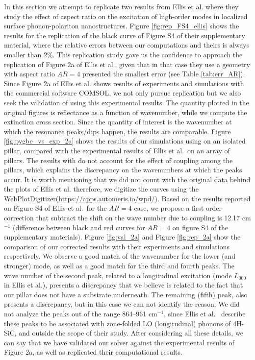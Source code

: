 In this section we attempt to replicate two results from Ellis et al. \cite{ellis2016} where they study the effect of aspect ratio on the 
excitation of high-order modes in localized surface phonon-polariton nanostructures. Figure \ref{fig:rep_FS4_ellis} shows the results for
the replication of the black curve of Figure S4 of their supplementary material, where the relative errors between our computations and 
theirs is always smaller than 2$\%$. This replication study gave us the confidence to approach the replication of Figure 2a of Ellis et al., 
given that in that case they use a geometry with aspect ratio $AR=4$ presented the smallest error (see Table \ref{tab:err_AR}). Since 
Figure 2a of Ellis et al. shows results of experiments and simulations with the commercial software COMSOL, we not only pursue replication 
but we also seek the validation of \pygbe using this experimental results. The quantity plotted in the original figures is reflectance as a 
function of wavenumber, while we compute the extinction cross section. Since the quantity of interest is the wavenumber at which the resonance 
peaks/dips happen, the results are comparable. 
Figure \ref{fig:pygbe_vs_exp_2a} shows the results of our simulations using \pygbe on an isolated pillar, compared with the experimental results
of Ellis et al.\ on an array of pillars. The results with \pygbe do not account for the effect of coupling among the pillars, which explains the  
discrepancy on the wavenumbers at which the peaks occur. It is worth mentioning that we did not count with the original data behind the plots of 
Ellis et al. therefore, we digitize the curves using the WebPlotDigitizer(\url{https://apps.automeris.io/wpd/}). Based on the results reported 
on Figure S4 of Ellis et al.\ for the $AR=4$ case, we propose a first order correction that subtract the shift on the wave number due to
coupling is 12.17 cm$^{-1}$ (difference between black and red curves for $AR=4$ on figure S4 of the supplementary materials). Figure \ref{fig:val_2a}
and Figure \ref{fig:rep_2a} show the comparison of our corrected results with their experiments and simulations respectively. We observe a good match 
of the wavenumber for the lower (and stronger) mode, as well as a good match for the  third and fourth peaks. The wave number of the second peak, related 
to a longitudinal excitation (mode $L_{000}$ in Ellis et al.), presents a discrepancy that we believe is related to the fact that our 
pillar does not have a substrate underneath. The remaining (fifth) peak, also presents a discrepancy, but in this case we can not identify the reason.
We did not analyze the peaks out of the range 864--961 cm$^{-1}$, since Ellis et al. \ describe these peaks to be associated with 
zone-folded LO (longitudinal) phonons of 4H-SiC, and outside the scope of their study.
After considering all these details, we can say that we have validated our solver \pygbe against the experimental results of 
Figure 2a, as well as replicated their computational results.
